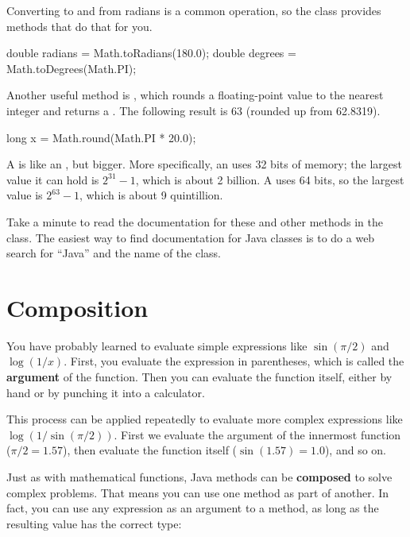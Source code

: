 Converting to and from radians is a common operation, so the  class provides methods that do that for you.

\begin{code}
double radians = Math.toRadians(180.0);
double degrees = Math.toDegrees(Math.PI);
\end{code}


Another useful method is , which rounds a floating-point value to the nearest integer and returns a .
The following result is 63 (rounded up from 62.8319).

\begin{code}
long x = Math.round(Math.PI * 20.0);
\end{code}

A  is like an , but bigger.
More specifically, an  uses 32 bits of memory; the largest value it can hold is $2^{31}-1$, which is about 2 billion.
A  uses 64 bits, so the largest value is $2^{63}-1$, which is about 9 quintillion.

Take a minute to read the documentation for these and other methods in the  class.
The easiest way to find documentation for Java classes is to do a web search for ``Java'' and the name of the class.


\section{Composition}


You have probably learned to evaluate simple expressions like $\sin(\pi/2)$ and $\log(1/x)$.
First, you evaluate the expression in parentheses, which is called the {\bf argument} of the function.
Then you can evaluate the function itself, either by hand or by punching it into a calculator.

This process can be applied repeatedly to evaluate more complex expressions like $\log(1/\sin(\pi/2))$.
First we evaluate the argument of the innermost function ($\pi/2 = 1.57$), then evaluate the function itself ($\sin(1.57) = 1.0$), and so on.


Just as with mathematical functions, Java methods can be {\bf composed} to solve complex problems.
That means you can use one method as part of another.
In fact, you can use any expression as an argument to a method, as long as the resulting value has the correct type:

